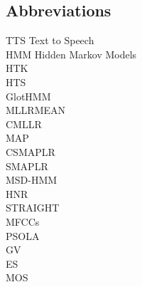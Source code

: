 \documentclass[english,12pt,a4paper,pdftex]{article}
\begin{document}
\subsection*{Abbreviations}
TTS Text to Speech \\
HMM Hidden Markov Models \\
HTK \\
HTS \\
GlotHMM \\
MLLRMEAN \\
CMLLR \\
MAP \\
CSMAPLR \\
SMAPLR \\
MSD-HMM\\
HNR\\
STRAIGHT\\
MFCCs\\
PSOLA\\
GV\\
ES\\
MOS\\
\cleardoublepage
\storeinipagenumber
{}
\setcounter{page}{1}




\thispagestyle{empty}

\clearpage
%








\clearpage





\appendix 
\clearpage


\renewcommand{\theequation}{A\arabic{equation}}
\setcounter{equation}{0}  
\renewcommand{\thefigure}{A\arabic{figure}}
\setcounter{figure}{0}
\renewcommand{\thetable}{A\arabic{table}}
\setcounter{table}{0}
\end{document}
